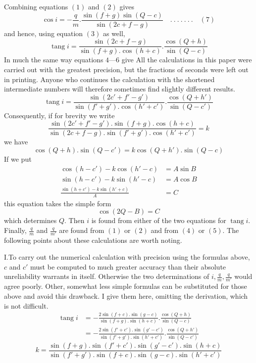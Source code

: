Combining equations $(1)$ and $(2)$ gives
\[
\cos i=-\frac{q}{m}.\frac{\sin(f+g)\sin(Q-c)}{\sin(2c+f-g)}\quad.\ .\ .\ .\ .\ .\ .\quad(7)
\]
and hence, using equation $(3)$ as well,
\[
\operatorname{tang}i=\frac{\sin(2c+f-g)}{\sin(f+g).\cos(h+c)}.\frac{\cos(Q+h)}{\sin(Q-c)}
\]
In much the same way equations $4$---$6$ give
\expandafter\def\csname HistoricalNoteText473\endcsname{All the calculations in this paper were carried out with the greatest precision, but the fractions of seconds were left out in printing. Anyone who continues the calculation with the shortened intermediate numbers will therefore sometimes find slightly different results.}
\[
\operatorname{tang}i=\frac{\sin(2c'+f'-g')}{\sin(f'+g').\cos(h'+c')}.\frac{\cos(Q+h')}{\sin(Q-c')}
\]
Consequently, if for brevity we write
\[
\frac{\sin(2c'+f'-g').\sin(f+g).\cos(h+c)}{\sin(2c+f-g).\sin(f'+g').\cos(h'+c')}=k
\]
we have
\[
\cos(Q+h).\sin(Q-c')=k\cos(Q+h').\sin(Q-c)
\]
If we put
\[
\begin{aligned}
\cos(h-c')-k\cos(h'-c)&=A\sin B\\
\sin(h-c')-k\sin(h'-c)&=A\cos B\\
\frac{\sin(h+c')-k\sin(h'+c)}{A}&=C
\end{aligned}
\]
this equation takes the simple form
\[
\cos(2Q-B)=C
\]
which determines $Q$. Then $i$ is found from either of the two equations for $\operatorname{tang}i$. Finally, $\frac{q}{m}$ and $\frac{q}{m'}$ are found from $(1)$ or $(2)$ and from $(4)$ or $(5)$. The following points about these calculations are worth noting.

I.\quad To carry out the numerical calculation with precision using the formulas above, $c$ and $c'$ must be computed to much greater accuracy than their absolute unreliability warrants in itself. Otherwise the two determinations of $i,\frac{q}{m},\frac{q}{m'}$ would agree poorly. Other, somewhat less simple formulas can be substituted for those above and avoid this drawback. I give them here, omitting the derivation, which is not difficult.
\[
\begin{aligned}
\operatorname{tang}i&=-\frac{2\sin(f+c).\sin(g-c)}{\sin(f+g).\sin(h+c)}.\frac{\cos(Q+h)}{\sin(Q-c)}\\
&=-\frac{2\sin(f'+c').\sin(g'-c')}{\sin(f'+g').\sin(h'+c')}.\frac{\cos(Q+h')}{\sin(Q-c')}
\end{aligned}
\]
\[
k=\frac{\sin(f+g).\sin(f'+c').\sin(g'-c').\sin(h+c)}{\sin(f'+g').\sin(f+c).\sin(g-c).\sin(h'+c')}
\]


